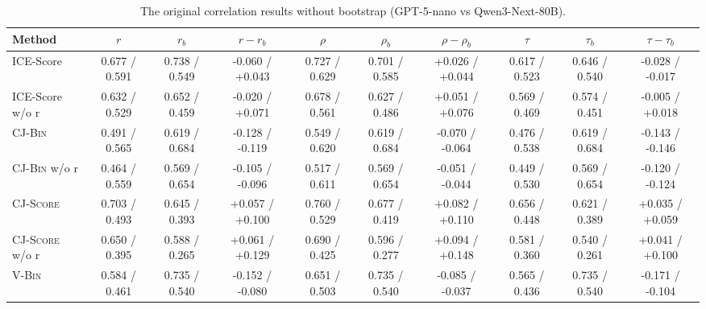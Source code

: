 \begin{table}[t]
    \centering
    \scriptsize
    \setlength{\tabcolsep}{3.5pt}
    \caption{The original correlation results without bootstrap (GPT-5-nano vs Qwen3-Next-80B).}
    \label{tab:unified-settings-models}
    \begin{tabular}{@{}
        l|ccc|ccc|ccc@{}}
        \toprule
        Method & $r$ & $r_b$ & $r-r_b$ & $\rho$ & $\rho_b$ & $\rho-\rho_b$ & $\tau$ & $\tau_b$ & $\tau-\tau_b$ \\
        \midrule
        \midrule
        ICE-Score               & 0.677 / 0.591   & 0.738 / 0.549   & -0.060 / +0.043                     & 0.727 / 0.629   & 0.701 / 0.585   & +0.026 / +0.044                     & 0.617 / 0.523   & 0.646 / 0.540   & -0.028 / -0.017                     \\
        ICE-Score w/o r         & 0.632 / 0.529   & 0.652 / 0.459   & -0.020 / +0.071                     & 0.678 / 0.561   & 0.627 / 0.486   & +0.051 / +0.076                     & 0.569 / 0.469   & 0.574 / 0.451   & -0.005 / +0.018                     \\
        \midrule
        \textsc{CJ-Bin}         & 0.491 / 0.565   & 0.619 / 0.684   & -0.128 / -0.119                     & 0.549 / 0.620   & 0.619 / 0.684   & -0.070 / -0.064                     & 0.476 / 0.538   & 0.619 / 0.684   & -0.143 / -0.146                     \\
        \textsc{CJ-Bin} w/o r   & 0.464 / 0.559   & 0.569 / 0.654   & -0.105 / -0.096                     & 0.517 / 0.611   & 0.569 / 0.654   & -0.051 / -0.044                     & 0.449 / 0.530   & 0.569 / 0.654   & -0.120 / -0.124                     \\
        \textsc{CJ-Score}       & 0.703 / 0.493   & 0.645 / 0.393   & +0.057 / +0.100                     & 0.760 / 0.529   & 0.677 / 0.419   & +0.082 / +0.110                     & 0.656 / 0.448   & 0.621 / 0.389   & +0.035 / +0.059                     \\
        \textsc{CJ-Score} w/o r & 0.650 / 0.395   & 0.588 / 0.265   & +0.061 / +0.129                     & 0.690 / 0.425   & 0.596 / 0.277   & +0.094 / +0.148                     & 0.581 / 0.360   & 0.540 / 0.261   & +0.041 / +0.100                     \\
        \midrule
        \textsc{V-Bin}          & 0.584 / 0.461   & 0.735 / 0.540   & -0.152 / -0.080                     & 0.651 / 0.503   & 0.735 / 0.540   & -0.085 / -0.037                     & 0.565 / 0.436   & 0.735 / 0.540   & -0.171 / -0.104                     \\

\end{tabular}
\end{table}

